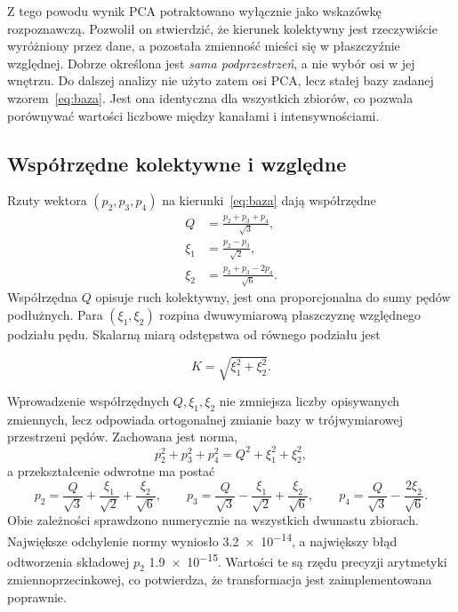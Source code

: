 \documentclass[12pt,a4paper]{article}
\begin{document}
Z tego powodu wynik PCA potraktowano wyłącznie jako wskazówkę
rozpoznawczą. Pozwolił on stwierdzić, że kierunek kolektywny jest
rzeczywiście wyróżniony przez dane, a pozostała zmienność mieści się
w płaszczyźnie względnej. Dobrze określona jest \emph{sama podprzestrzeń}, a nie wybór osi w
jej wnętrzu. Do dalszej analizy nie użyto zatem osi PCA, lecz stałej
bazy zadanej wzorem~\eqref{eq:baza}. Jest ona identyczna dla
wszystkich zbiorów, co pozwala porównywać wartości liczbowe między
kanałami i intensywnościami.

\subsection{Współrzędne kolektywne i względne}
\label{sec:baza}


Rzuty wektora $(p_2,p_3,p_4)$ na kierunki~\eqref{eq:baza} dają
współrzędne
\begin{align}
Q     &= \frac{p_2+p_3+p_4}{\sqrt3}, \label{eq:Q}\\
\xi_1 &= \frac{p_2-p_3}{\sqrt2},     \label{eq:xi1}\\
\xi_2 &= \frac{p_2+p_3-2p_4}{\sqrt6}.\label{eq:xi2}
\end{align}
Współrzędna $Q$ opisuje ruch kolektywny, jest ona proporcjonalna do sumy
pędów podłużnych. Para $(\xi_1,\xi_2)$ rozpina dwuwymiarową
płaszczyznę względnego podziału pędu. Skalarną miarą odstępstwa od
równego podziału jest

\begin{equation}
K=\sqrt{\xi_1^2+\xi_2^2}.
\label{eq:K}
\end{equation}

Wprowadzenie współrzędnych \(Q,\xi_1,\xi_2\) nie zmniejsza liczby opisywanych zmiennych, lecz odpowiada ortogonalnej zmianie bazy w trójwymiarowej przestrzeni pędów. Zachowana jest norma,
\begin{equation}
p_2^2+p_3^2+p_4^2=Q^2+\xi_1^2+\xi_2^2,
\label{eq:norma}
\end{equation}
a przekształcenie odwrotne ma postać
\begin{equation}
p_2=\frac{Q}{\sqrt3}+\frac{\xi_1}{\sqrt2}+\frac{\xi_2}{\sqrt6},\qquad
p_3=\frac{Q}{\sqrt3}-\frac{\xi_1}{\sqrt2}+\frac{\xi_2}{\sqrt6},\qquad
p_4=\frac{Q}{\sqrt3}-\frac{2\xi_2}{\sqrt6}.
\label{eq:odwrotna}
\end{equation}
Obie zależności sprawdzono numerycznie na wszystkich dwunastu zbiorach.
Największe odchylenie normy wyniosło \num{3.2e-14}, a największy błąd
odtworzenia składowej $p_2$ \num{1.9e-15}. Wartości te są rzędu precyzji
arytmetyki zmiennoprzecinkowej, co potwierdza, że transformacja jest
zaimplementowana poprawnie.
\end{document}
